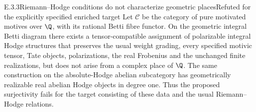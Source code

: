 \begin{result}{E.3.3}{Riemann--Hodge conditions do not characterize geometric places}{Refuted for the explicitly specified enriched target}
Let $\mathcal C$ be the category of pure motivated motives over $\Q$, with its rational Betti fibre functor. On the geometric integral Betti diagram there exists a tensor-compatible assignment of polarizable integral Hodge structures that preserves the usual weight grading, every specified motivic tensor, Tate objects, polarizations, the real Frobenius and the unchanged finite realizations, but does not arise from a complex place of $\Q$. The same construction on the absolute-Hodge abelian subcategory has geometrically realizable real abelian Hodge objects in degree one. Thus the proposed surjectivity fails for the target consisting of these data and the usual Riemann--Hodge relations.
\end{result}
